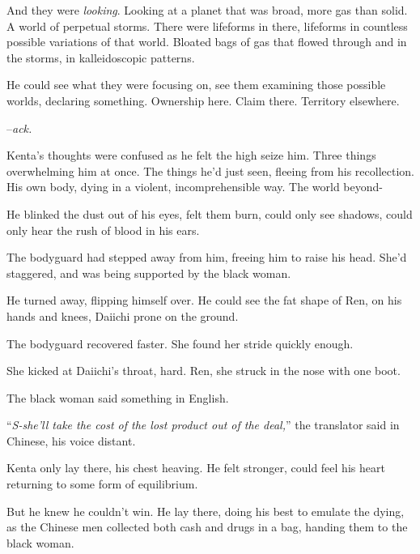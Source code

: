 And they were \emph{looking}.  Looking at a planet that was broad, more gas than solid.  A world of perpetual storms.  There were lifeforms in there, lifeforms in countless possible variations of that world.  Bloated bags of gas that flowed through and in the storms, in kalleidoscopic patterns.



He could see what they were focusing on, see them examining those possible worlds, declaring something.  Ownership here.  Claim there.  Territory elsewhere.



–\emph{ack.}



Kenta's thoughts were confused as he felt the high seize him.  Three things overwhelming him at once.  The things he'd just seen, fleeing from his recollection.  His own body, dying in a violent, incomprehensible way.  The world beyond-



He blinked the dust out of his eyes, felt them burn, could only see shadows, could only hear the rush of blood in his ears.



The bodyguard had stepped away from him, freeing him to raise his head.  She'd staggered, and was being supported by the black woman.



He turned away, flipping himself over.  He could see the fat shape of Ren, on his hands and knees, Daiichi prone on the ground.



The bodyguard recovered faster.  She found her stride quickly enough.



She kicked at Daiichi's throat, hard.  Ren, she struck in the nose with one boot.



The black woman said something in English.



``\emph{S-she'll take the cost of the lost product out of the deal,}'' the translator said in Chinese, his voice distant.



Kenta only lay there, his chest heaving.  He felt stronger, could feel his heart returning to some form of equilibrium.



But he knew he couldn't win.  He lay there, doing his best to emulate the dying, as the Chinese men collected both cash and drugs in a bag, handing them to the black woman.



